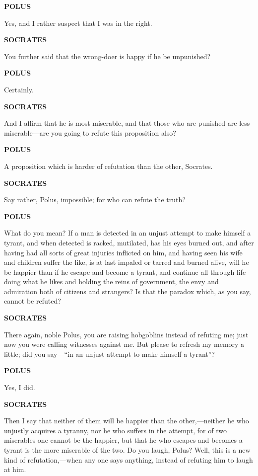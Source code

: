 \documentclass[11pt,letter]{article}
\begin{document}
\par \textbf{POLUS}
\par   Yes, and I rather suspect that I was in the right.

\par \textbf{SOCRATES}
\par   You further said that the wrong-doer is happy if he be unpunished?

\par \textbf{POLUS}
\par   Certainly.

\par \textbf{SOCRATES}
\par   And I affirm that he is most miserable, and that those who are punished are less miserable—are you going to refute this proposition also?

\par \textbf{POLUS}
\par   A proposition which is harder of refutation than the other, Socrates.

\par \textbf{SOCRATES}
\par   Say rather, Polus, impossible; for who can refute the truth?

\par \textbf{POLUS}
\par   What do you mean? If a man is detected in an unjust attempt to make himself a tyrant, and when detected is racked, mutilated, has his eyes burned out, and after having had all sorts of great injuries inflicted on him, and having seen his wife and children suffer the like, is at last impaled or tarred and burned alive, will he be happier than if he escape and become a tyrant, and continue all through life doing what he likes and holding the reins of government, the envy and admiration both of citizens and strangers? Is that the paradox which, as you say, cannot be refuted?

\par \textbf{SOCRATES}
\par   There again, noble Polus, you are raising hobgoblins instead of refuting me; just now you were calling witnesses against me. But please to refresh my memory a little; did you say—“in an unjust attempt to make himself a tyrant”?

\par \textbf{POLUS}
\par   Yes, I did.

\par \textbf{SOCRATES}
\par   Then I say that neither of them will be happier than the other,—neither he who unjustly acquires a tyranny, nor he who suffers in the attempt, for of two miserables one cannot be the happier, but that he who escapes and becomes a tyrant is the more miserable of the two. Do you laugh, Polus? Well, this is a new kind of refutation,—when any one says anything, instead of refuting him to laugh at him.
\end{document}
